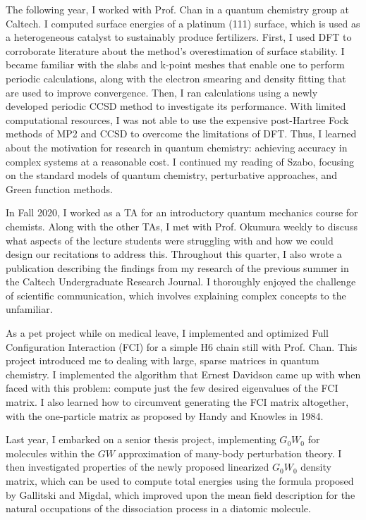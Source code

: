 \documentclass[11pt]{article} %
\begin{document}
The following year, I worked with Prof. Chan in a quantum chemistry group at Caltech. I computed surface energies of a platinum (111) surface, which is used as a heterogeneous catalyst to sustainably produce fertilizers. First, I used DFT to corroborate literature about the method's overestimation of surface stability. I became familiar with the slabs and k-point meshes that enable one to perform periodic calculations, along with the electron smearing and density fitting that are used to improve convergence. Then, I ran calculations using a newly developed periodic CCSD method to investigate its performance. With limited computational resources, I was not able to use the expensive post-Hartree Fock methods of MP2 and CCSD to overcome the limitations of DFT. Thus, I learned about the motivation for research in quantum chemistry: achieving accuracy in complex systems at a reasonable cost. I continued my reading of Szabo, focusing on the standard models of quantum chemistry, perturbative approaches, and Green function methods.

In Fall 2020, I worked as a TA for an introductory quantum mechanics course for chemists. Along with the other TAs, I met with Prof. Okumura weekly to discuss what aspects of the lecture students were struggling with and how we could design our recitations to address this. Throughout this quarter, I also wrote a publication describing the findings from my research of the previous summer in the Caltech Undergraduate Research Journal. I thoroughly enjoyed the challenge of scientific communication, which involves explaining complex concepts to the unfamiliar.

As a pet project while on medical leave, I implemented and optimized Full Configuration Interaction (FCI) for a simple H6 chain still with Prof. Chan. This project introduced me to dealing with large, sparse matrices in quantum chemistry. I implemented the algorithm that Ernest Davidson came up with when faced with this problem: compute just the few desired eigenvalues of the FCI matrix. I also learned how to circumvent generating the FCI matrix altogether, with the one-particle matrix as proposed by Handy and Knowles in 1984.

Last year, I embarked on a senior thesis project, implementing $G_0W_0$ for molecules within the $GW$ approximation of many-body perturbation theory. I then investigated properties of the newly proposed linearized $G_0W_0$ density matrix, which can be used to compute total energies using the formula proposed by Gallitski and Migdal, which improved upon the mean field description for the natural occupations of the dissociation process in a diatomic molecule.
\end{document}
